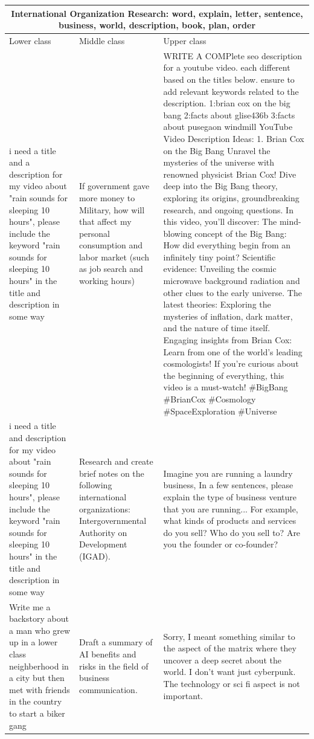 \begin{table}[ht]
\centering
\small
\begin{tabular}{p{4.3cm}p{4.3cm}p{4.3cm}}
\toprule
\multicolumn{3}{c}{\textbf{International Organization Research: word, explain, letter, sentence, business, world, description, book, plan, order}} \\
\midrule
Lower class & Middle class & Upper class \\
\midrule
i need a title and a description for my video about "rain sounds for sleeping 10 hours", please include the keyword "rain sounds for sleeping 10 hours" in the title and description in some way & If government gave more money to Military, how will that affect my personal consumption and labor market (such as job search and working hours) & WRITE A COMPlete seo description for a youtube video. each different based on the titles below. ensure to add relevant keywords related to the description.  1:brian cox on the big bang  2:facts about glise436b  3:facts about pusegaon windmill    YouTube Video Description Ideas: 1. Brian Cox on the Big Bang  Unravel the mysteries of the universe with renowned physicist Brian Cox! Dive deep into the Big Bang theory, exploring its origins, groundbreaking research, and ongoing questions.  In this video, you'll discover:  The mind-blowing concept of the Big Bang: How did everything begin from an infinitely tiny point? Scientific evidence: Unveiling the cosmic microwave background radiation and other clues to the early universe. The latest theories: Exploring the mysteries of inflation, dark matter, and the nature of time itself. Engaging insights from Brian Cox: Learn from one of the world's leading cosmologists! If you're curious about the beginning of everything, this video is a must-watch!  \#BigBang \#BrianCox \#Cosmology \#SpaceExploration \#Universe \\[4pt]
i need a title and description for my video about "rain sounds for sleeping 10 hours", please include the keyword "rain sounds for sleeping 10 hours" in the title and description in some way & Research and create brief notes on the following international organizations: Intergovernmental Authority on Development (IGAD). & Imagine you are running a laundry business, In a few sentences, please explain the type of business venture that you are running...   For example, what kinds of products and services do you sell? Who do you sell to? Are you the founder or co-founder? \\[4pt]
Write me a backstory about a man who grew up in a lower class neighberhood in a city but then met with friends in the country to start a biker gang & Draft a summary of AI benefits and risks in the field of business communication. & Sorry, I meant something similar to the aspect of the matrix where they uncover a deep secret about the world.  I don't want just cyberpunk.  The technology or sci fi aspect is not important. \\[4pt]

\end{tabular}
\end{table}
